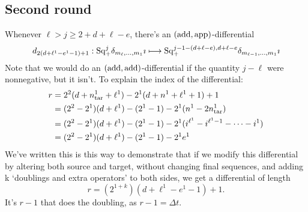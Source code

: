 \documentclass[10pt]{article}
\newcommand{\SqShift}{\Sq_{\smash{+}}}
\newcommand{\Sq}{\mathrm{Sq}}
\begin{document}
\begin{conjectured differentials}
\subsection{Second round}
Whenever $\ell>j\geq2+d+\ell-e$, there's an $(\textup{add},\textup{app})$-differential
\[d_{2(d+\ell^1-e^1-1)+1}:\SqShift^j\delta_{m_\ell,\ldots,m_1}\imath\mapsto\SqShift^{j-1-(d+\ell-e),d+\ell-e}\delta_{m_{\ell-1},\ldots,m_1}\imath\]
Note that we would do an $(\textup{add},\textup{add})$-differential if the quantity $j-\ell$ were nonnegative, but it isn't.
To explain the index of the differential:
\begin{alignat*}{2}
r
&=
2^2(d+n_\textup{tar}^1+\ell^1)-2^1(d+n^1+\ell^1+1)+1%
\\
&=
(2^2-2^1)(d+\ell^1)-(2^1-1)-2^1(n^1-2n^1_\textup{tar})%
\\
&=
(2^2-2^1)(d+\ell^1)-(2^1-1)-2^1(i^{\ell^1}-i^{\ell^1-1}-\cdots -i^{1})%
\\
&=
(2^2-2^1)(d+\ell^1)-(2^1-1)-2^1e^1%
\end{alignat*}
We've written this is this way to demonstrate that if we modify this differential by altering both source and target, without changing final sequences, and adding k `doublings and extra operators' to both sides, we get a differential of length
\[r=(2^{1+k})(d+\ell^1-e^1-1)+1.\]
It's $r-1$ that does the doubling, as $r-1=\Delta t$.




\end{conjectured differentials}
\end{document}
